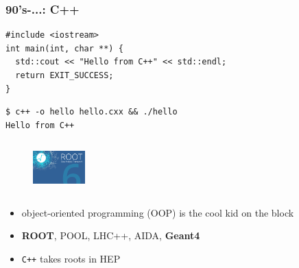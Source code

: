 \documentclass[9pt]{beamer}
\begin{document}
\begin{frame}[fragile]
\frametitle{90's-...: C++}


	\begin{block}{}
\begin{verbatim}
#include <iostream>
int main(int, char **) {
  std::cout << "Hello from C++" << std::endl;
  return EXIT_SUCCESS;
}
\end{verbatim}
	\end{block}{}


	\begin{exampleblock}{}
\begin{verbatim}
$ c++ -o hello hello.cxx && ./hello
Hello from C++
\end{verbatim}
	\end{exampleblock}{}


\begin{figure}[h]
\begin{center}
\includegraphics[width=2cm,height=2cm]{_figs/my-root6splash.png}
\end{center}

\end{figure}

\begin{itemize}
\item object-oriented programming (OOP) is the cool kid on the block
\item \textbf{ROOT}, POOL, LHC++, AIDA, \textbf{Geant4}
\item \texttt{C++} takes roots in HEP
\end{itemize}


\end{frame}
\end{document}
